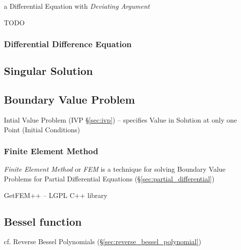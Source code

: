 a Differential Equation with \emph{Deviating Argument}

TODO



\subsubsection{Differential Difference Equation}\label{sec:dde}



\subsection{Singular Solution}\label{sec:singular_solution}

\subsection{Boundary Value Problem}\label{sec:boundary_value_problem}


\fist Intial Value Problem (IVP \S\ref{sec:ivp}) -- specifies Value in Solution
at only one Point (Initial Conditions)



\subsubsection{Finite Element Method}\label{sec:finite_element_method}

\emph{Finite Element Method} or \emph{FEM} is a technique for solving
Boundary Value Problems for Partial Differential Equations
(\S\ref{sec:partial_differential})

GetFEM++ -- LGPL C++ library



\subsection{Bessel function}\label{sec:bessel_function}

cf. Reverse Bessel Polynomials (\S\ref{sec:reverse_bessel_polynomial})



